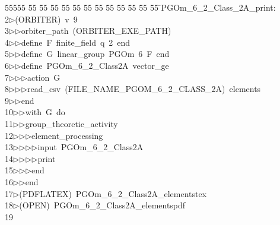 %
%
\begin{tabbing}
55555 \= 55 \= 55 \= 55 \= 55 \= 55 \= 55 \= 55 \= 55 \= 55 \= 55 \= 55 \= 55 \= \>PGOm\_6\_2\_Class\_2A\_print:\\[0pt]
2\>$\triangleright$\>(ORBITER)\ v\ 9\ \\[0pt]
3\>$\triangleright$\>$\triangleright$\>orbiter\_path\ (ORBITER\_EXE\_PATH)\ \\[0pt]
4\>$\triangleright$\>$\triangleright$\>define\ F\ finite\_field\ q\ 2\ end\ \\[0pt]
5\>$\triangleright$\>$\triangleright$\>define\ G\ linear\_group\ PGOm\ 6\ F\ end\ \\[0pt]
6\>$\triangleright$\>$\triangleright$\>define\ PGOm\_6\_2\_Class2A\ vector\_ge\ \\[0pt]
7\>$\triangleright$\>$\triangleright$\>$\triangleright$\>action\ G\ \\[0pt]
8\>$\triangleright$\>$\triangleright$\>$\triangleright$\>read\_csv\ (FILE\_NAME\_PGOM\_6\_2\_CLASS\_2A)\ elements\ \\[0pt]
9\>$\triangleright$\>$\triangleright$\>end\ \\[0pt]
10\>$\triangleright$\>$\triangleright$\>with\ G\ do\ \\[0pt]
11\>$\triangleright$\>$\triangleright$\>group\_theoretic\_activity\ \\[0pt]
12\>$\triangleright$\>$\triangleright$\>$\triangleright$\>element\_processing\ \\[0pt]
13\>$\triangleright$\>$\triangleright$\>$\triangleright$\>$\triangleright$\>input\ PGOm\_6\_2\_Class2A\ \\[0pt]
14\>$\triangleright$\>$\triangleright$\>$\triangleright$\>$\triangleright$\>print\ \\[0pt]
15\>$\triangleright$\>$\triangleright$\>$\triangleright$\>end\ \\[0pt]
16\>$\triangleright$\>$\triangleright$\>end\\[0pt]
17\>$\triangleright$\>(PDFLATEX)\ PGOm\_6\_2\_Class2A\_elementstex\\[0pt]
18\>$\triangleright$\>(OPEN)\ PGOm\_6\_2\_Class2A\_elementspdf\\[0pt]
19\>\end{tabbing}
